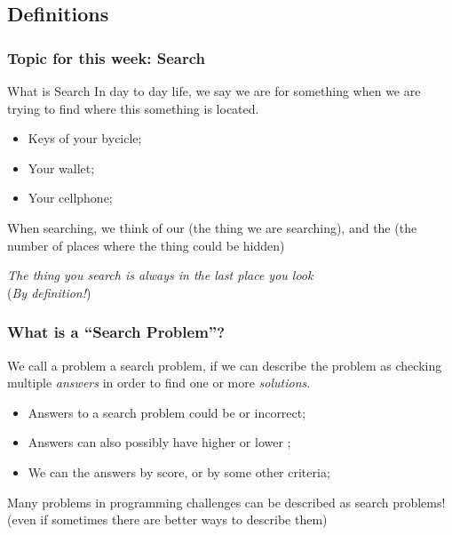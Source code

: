 \documentclass{beamer}
\begin{document}
\subsection{Definitions}
\begin{frame}
  \frametitle{Topic for this week: Search}

  \begin{block}{What is Search}
    In day to day life, we say we are  for
    something when we are trying to find where this something is
    located.

    \begin{itemize}
    \item Keys of your bycicle;
    \item Your wallet;
    \item Your cellphone;
    \end{itemize}

    When searching, we think of our  (the thing we are
    searching), and the  (the number of places
    where the thing could be hidden)
    
  \end{block}
  
  {\smaller
  \hfill \emph{The thing you search is always in the last place you look}\\
  \hfill (\emph{By definition!})}
\end{frame}

\begin{frame}
  \frametitle{What is a ``Search Problem''?}
  {\small
    
    We call a problem a search problem, if we can describe the problem
    as checking multiple \emph{answers} in order to find one or more
    \emph{solutions}.

    \medskip

    \begin{itemize}
    \item Answers to a search problem could be  or \alert{incorrect};
    \item Answers can also possibly have higher or lower ;
    \item We can  the answers by score, or by some other criteria;
    \end{itemize}

    \bigskip

    Many problems in programming challenges can be described as search
    problems! (even if sometimes there are better ways to describe
    them)
  }
\end{frame}
\end{document}
